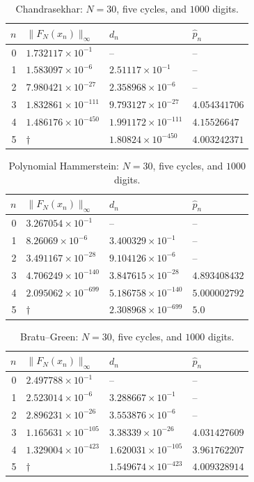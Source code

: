 \documentclass[11pt,a4paper]{article}
\numberwithin{equation}{section}
\numberwithin{table}{section}
\theoremstyle{plain}
\theoremstyle{definition}\newtheorem{definition}[theorem]{Definition}
\theoremstyle{remark}\newtheorem{remark}[theorem]{Remark}
\begin{document}
\begin{table}[htbp]\centering\small
\begin{tabular}{@{}rlll@{}}\toprule
$n$ & $\|F_N(x_n)\|_\infty$ & $d_n$ & $\widehat p_n$\\\midrule
0 & $1.732117\times10^{-1}$ & -- & --\\
1 & $1.583097\times10^{-6}$ & $2.51117\times10^{-1}$ & --\\
2 & $7.980421\times10^{-27}$ & $2.358968\times10^{-6}$ & --\\
3 & $1.832861\times10^{-111}$ & $9.793127\times10^{-27}$ & $4.054341706$\\
4 & $1.486176\times10^{-450}$ & $1.991172\times10^{-111}$ & $4.15526647$\\
5 & $\dagger$ & $1.80824\times10^{-450}$ & $4.003242371$\\
\bottomrule\end{tabular}
\caption{Chandrasekhar: $N=30$, five cycles, and $1000$ digits.}\label{supp:tab:history-chandrasekhar}
\end{table}
\begin{table}[htbp]\centering\small
\begin{tabular}{@{}rlll@{}}\toprule
$n$ & $\|F_N(x_n)\|_\infty$ & $d_n$ & $\widehat p_n$\\\midrule
0 & $3.267054\times10^{-1}$ & -- & --\\
1 & $8.26069\times10^{-6}$ & $3.400329\times10^{-1}$ & --\\
2 & $3.491167\times10^{-28}$ & $9.104126\times10^{-6}$ & --\\
3 & $4.706249\times10^{-140}$ & $3.847615\times10^{-28}$ & $4.893408432$\\
4 & $2.095062\times10^{-699}$ & $5.186758\times10^{-140}$ & $5.000002792$\\
5 & $\dagger$ & $2.308968\times10^{-699}$ & $5.0$\\
\bottomrule\end{tabular}
\caption{Polynomial Hammerstein: $N=30$, five cycles, and $1000$ digits.}\label{supp:tab:history-polinomico}
\end{table}
\begin{table}[htbp]\centering\small
\begin{tabular}{@{}rlll@{}}\toprule
$n$ & $\|F_N(x_n)\|_\infty$ & $d_n$ & $\widehat p_n$\\\midrule
0 & $2.497788\times10^{-1}$ & -- & --\\
1 & $2.523014\times10^{-6}$ & $3.288667\times10^{-1}$ & --\\
2 & $2.896231\times10^{-26}$ & $3.553876\times10^{-6}$ & --\\
3 & $1.165631\times10^{-105}$ & $3.38339\times10^{-26}$ & $4.031427609$\\
4 & $1.329004\times10^{-423}$ & $1.620031\times10^{-105}$ & $3.961762207$\\
5 & $\dagger$ & $1.549674\times10^{-423}$ & $4.009328914$\\
\bottomrule\end{tabular}
\caption{Bratu--Green: $N=30$, five cycles, and $1000$ digits.}\label{supp:tab:history-bratu}
\end{table}
\end{document}
